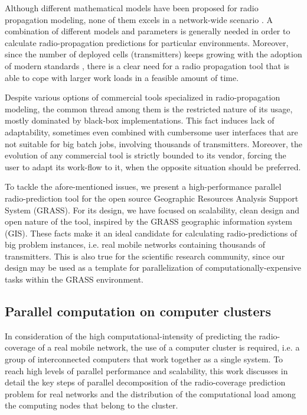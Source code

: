Although different mathematical models have been proposed for radio
propagation modeling, none of them excels in a network-wide scenario
\cite{Shabbir_Comparison_of_radio_propagation_models:2011}. A combination
of different models and parameters is generally needed in order to
calculate radio-propagation predictions for particular environments.
Moreover, since the number of deployed cells (transmitters) keeps
growing with the adoption of modern standards \cite{Saleh_On_the_coveraga_extension_in_LTE_networks:2010},
there is a clear need for a radio propagation tool that is able to
cope with larger work loads in a feasible amount of time.

Despite various options of commercial tools specialized in radio-propagation
modeling, the common thread among them is the restricted nature of
its usage, mostly dominated by black-box implementations. This fact
induces lack of adaptability, sometimes even combined with cumbersome
user interfaces that are not suitable for big batch jobs, involving
thousands of transmitters. Moreover, the evolution of any commercial
tool is strictly bounded to its vendor, forcing the user to adapt
its work-flow to it, when the opposite situation should be preferred.

To tackle the afore-mentioned issues, we present a high-performance
parallel radio-prediction tool for the open source Geographic Resources
Analysis Support System (GRASS). For its design, we have focused on
scalability, clean design and open nature of the tool, inspired by
the GRASS geographic information system (GIS). These facts make it
an ideal candidate for calculating radio-predictions of big problem
instances, i.e. real mobile networks containing thousands of transmitters.
This is also true for the scientific research community, since our
design may be used as a template for parallelization of computationally-expensive
tasks within the GRASS environment.


\subsection{Parallel computation on computer clusters}

In consideration of the high computational-intensity of predicting
the radio-coverage of a real mobile network, the use of a computer
cluster is required, i.e. a group of interconnected computers that
work together as a single system. To reach high levels of parallel
performance and scalability, this work discusses in detail the key
steps of parallel decomposition of the radio-coverage prediction problem
for real networks and the distribution of the computational load among
the computing nodes that belong to the cluster.

